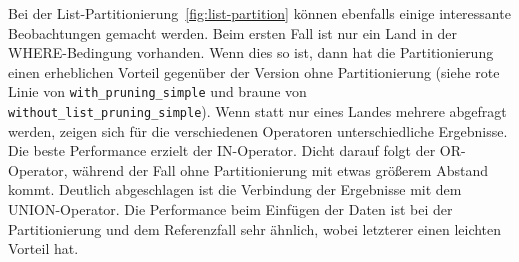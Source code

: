 Bei der List-Partitionierung~\ref{fig:list-partition} können ebenfalls einige interessante Beobachtungen gemacht werden.
Beim ersten Fall ist nur ein Land in der WHERE-Bedingung vorhanden.
Wenn dies so ist, dann hat die Partitionierung einen erheblichen Vorteil gegenüber der Version ohne Partitionierung (siehe rote Linie von \texttt{with\_pruning\_simple} und braune von \texttt{without\_list\_pruning\_simple}).
Wenn statt nur eines Landes mehrere abgefragt werden, zeigen sich für die verschiedenen Operatoren unterschiedliche Ergebnisse.
Die beste Performance erzielt der IN-Operator.
Dicht darauf folgt der OR-Operator, während der Fall ohne Partitionierung mit etwas größerem Abstand kommt.
Deutlich abgeschlagen ist die Verbindung der Ergebnisse mit dem UNION-Operator.
Die Performance beim Einfügen der Daten ist bei der Partitionierung und dem Referenzfall sehr ähnlich, wobei letzterer einen leichten Vorteil hat.

